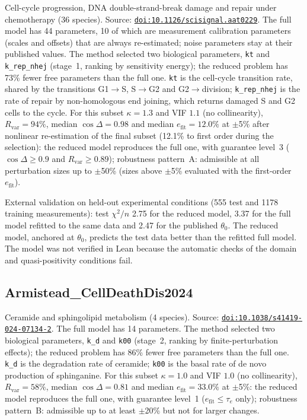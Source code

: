 Cell-cycle progression, DNA double-strand-break damage and repair under chemotherapy (36 species). Source: \href{https://doi.org/10.1126/scisignal.aat0229}{\nolinkurl{doi:10.1126/scisignal.aat0229}}. The full model has 44 parameters, 10 of which are measurement calibration parameters (scales and offsets) that are always re-estimated; noise parameters stay at their published values. The method selected two biological parameters, \texttt{kt} and \texttt{k\_rep\_nhej} (stage~1, ranking by sensitivity energy); the reduced problem has 73\% fewer free parameters than the full one. \texttt{kt} is the cell-cycle transition rate, shared by the transitions G1$\to$S, S$\to$G2 and G2$\to$division; \texttt{k\_rep\_nhej} is the rate of repair by non-homologous end joining, which returns damaged S and G2 cells to the cycle. For this subset $\kappa=1.3$ and VIF $1.1$ (no collinearity), $R_{\mathrm{var}}=94\%$, median $\cos\Delta=0.98$ and median $e_{\mathrm{fit}}=12.0\%$ at $\pm$5\% after nonlinear re-estimation of the final subset (12.1\% to first order during the selection): the reduced model reproduces the full one, with guarantee level~3 ($\cos\Delta\ge0.9$ and $R_{\mathrm{var}}\ge0.89$); robustness pattern~A: admissible at all perturbation sizes up to $\pm$50\% (sizes above $\pm$5\% evaluated with the first-order $e_{\mathrm{fit}}$).

External validation on held-out experimental conditions (555 test and 1178 training measurements): test $\chi^2/n$ 2.75 for the reduced model, 3.37 for the full model refitted to the same data and 2.47 for the published $\theta_0$. The reduced model, anchored at $\theta_0$, predicts the test data better than the refitted full model. The model was not verified in Lean because the automatic checks of the domain and quasi-positivity conditions fail.

\subsection*{Armistead\_CellDeathDis2024}

Ceramide and sphingolipid metabolism (4 species). Source: \href{https://doi.org/10.1038/s41419-024-07134-2}{\nolinkurl{doi:10.1038/s41419-024-07134-2}}. The full model has 14 parameters. The method selected two biological parameters, \texttt{k\_d} and \texttt{k00} (stage~2, ranking by finite-perturbation effects); the reduced problem has 86\% fewer free parameters than the full one. \texttt{k\_d} is the degradation rate of ceramide; \texttt{k00} is the basal rate of de novo production of sphinganine. For this subset $\kappa=1.0$ and VIF $1.0$ (no collinearity), $R_{\mathrm{var}}=58\%$, median $\cos\Delta=0.81$ and median $e_{\mathrm{fit}}=33.0\%$ at $\pm$5\%: the reduced model reproduces the full one, with guarantee level~1 ($e_{\mathrm{fit}}\le\tau_e$ only); robustness pattern~B: admissible up to at least $\pm$20\% but not for larger changes.

